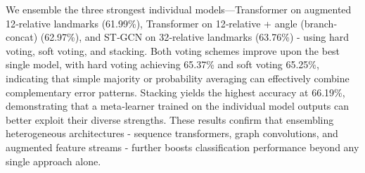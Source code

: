 \documentclass[journal,onecolumn, 11pt]{IEEEtran}
\begin{document}
We ensemble the three strongest individual models—Transformer on augmented 12‐relative landmarks (61.99\%), Transformer on 12‐relative + angle (branch‐concat) (62.97\%), and ST‐GCN on 32‐relative landmarks (63.76\%) - using hard voting, soft voting, and stacking. Both voting schemes improve upon the best single model, with hard voting achieving 65.37\% and soft voting 65.25\%, indicating that simple majority or probability averaging can effectively combine complementary error patterns. Stacking yields the highest accuracy at 66.19\%, demonstrating that a meta‐learner trained on the individual model outputs can better exploit their diverse strengths. These results confirm that ensembling heterogeneous architectures - sequence transformers, graph convolutions, and augmented feature streams - further boosts classification performance beyond any single approach alone.
\end{document}
